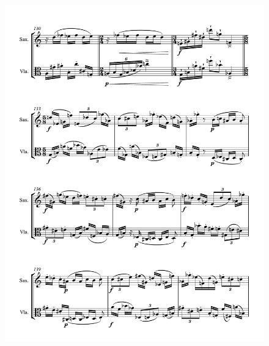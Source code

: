 \begin{figure}[htbp]
    \centering
	\includegraphics[width=6.5in]{figures/Sax_Viola_12.pdf}
\end{figure}

